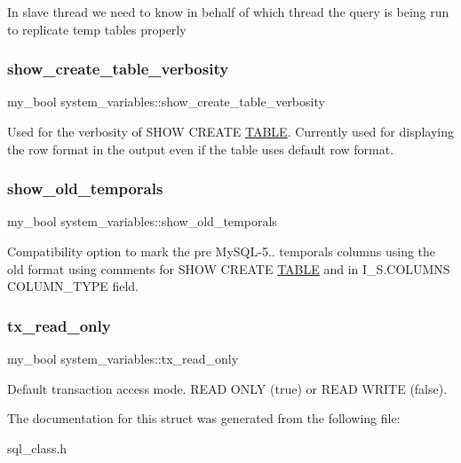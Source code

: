 In slave thread we need to know in behalf of which thread the query is being run to replicate temp tables properly \mbox{\label{structsystem__variables_ae6213a18e7a1e92a044c426cb3a10c8e}} 
\subsubsection{\texorpdfstring{show\+\_\+create\+\_\+table\+\_\+verbosity}{show\_create\_table\_verbosity}}
{\footnotesize\ttfamily my\+\_\+bool system\+\_\+variables\+::show\+\_\+create\+\_\+table\+\_\+verbosity}

Used for the verbosity of S\+H\+OW C\+R\+E\+A\+TE \mbox{\hyperlink{structTABLE}{T\+A\+B\+LE}}. Currently used for displaying the row format in the output even if the table uses default row format. \mbox{\label{structsystem__variables_abf0021568f7fe0b7f4f6ea91d6e164fb}} 
\subsubsection{\texorpdfstring{show\+\_\+old\+\_\+temporals}{show\_old\_temporals}}
{\footnotesize\ttfamily my\+\_\+bool system\+\_\+variables\+::show\+\_\+old\+\_\+temporals}

Compatibility option to mark the pre My\+S\+Q\+L-\/5.. temporals columns using the old format using comments for S\+H\+OW C\+R\+E\+A\+TE \mbox{\hyperlink{structTABLE}{T\+A\+B\+LE}} and in I\+\_\+\+S.\+C\+O\+L\+U\+M\+NS \textquotesingle{}C\+O\+L\+U\+M\+N\+\_\+\+T\+Y\+PE\textquotesingle{} field. \mbox{\label{structsystem__variables_ab2489ca441b76309299e895f0eef2238}} 
\subsubsection{\texorpdfstring{tx\+\_\+read\+\_\+only}{tx\_read\_only}}
{\footnotesize\ttfamily my\+\_\+bool system\+\_\+variables\+::tx\+\_\+read\+\_\+only}

Default transaction access mode. R\+E\+AD O\+N\+LY (true) or R\+E\+AD W\+R\+I\+TE (false). 

The documentation for this struct was generated from the following file\+:\begin{DoxyCompactItemize}
\item 
sql\+\_\+class.\+h\end{DoxyCompactItemize}
